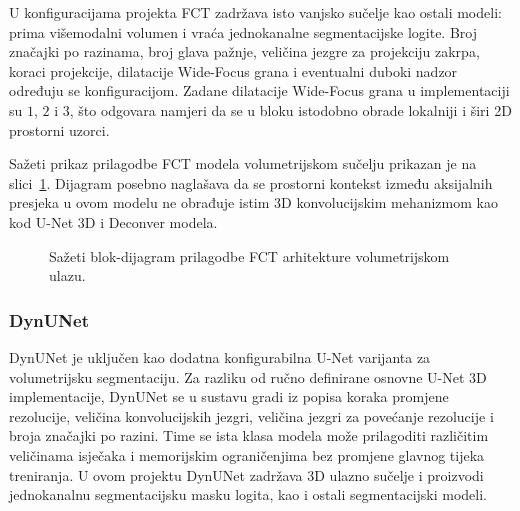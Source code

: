 \documentclass[a4paper,12pt,oneside]{article}
\begin{document}
U konfiguracijama projekta FCT zadržava isto vanjsko sučelje kao ostali modeli: prima višemodalni volumen i vraća jednokanalne segmentacijske logite. Broj značajki po razinama, broj glava pažnje, veličina jezgre za projekciju zakrpa, koraci projekcije, dilatacije Wide-Focus grana i eventualni duboki nadzor određuju se konfiguracijom. Zadane dilatacije Wide-Focus grana u implementaciji su $1$, $2$ i $3$, što odgovara namjeri da se u bloku istodobno obrade lokalniji i širi 2D prostorni uzorci.

Sažeti prikaz prilagodbe FCT modela volumetrijskom sučelju prikazan je na slici~\ref{fig:fct_arch}. Dijagram posebno naglašava da se prostorni kontekst između aksijalnih presjeka u ovom modelu ne obrađuje istim 3D konvolucijskim mehanizmom kao kod U-Net 3D i Deconver modela.

\begin{figure}[H]
\centering
{}
\caption{Sažeti blok-dijagram prilagodbe FCT arhitekture volumetrijskom ulazu. \label{fig:fct_arch}}
\end{figure}

\subsubsection{DynUNet}

DynUNet je uključen kao dodatna konfigurabilna U-Net varijanta za volumetrijsku segmentaciju. Za razliku od ručno definirane osnovne U-Net 3D implementacije, DynUNet se u sustavu gradi iz popisa koraka promjene rezolucije, veličina konvolucijskih jezgri, veličina jezgri za povećanje rezolucije i broja značajki po razini. Time se ista klasa modela može prilagoditi različitim veličinama isječaka i memorijskim ograničenjima bez promjene glavnog tijeka treniranja. U ovom projektu DynUNet zadržava 3D ulazno sučelje i proizvodi jednokanalnu segmentacijsku masku logita, kao i ostali segmentacijski modeli.
\end{document}
